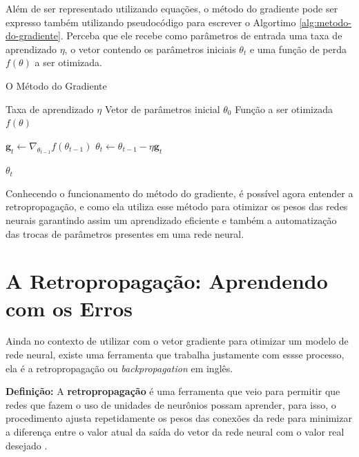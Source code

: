 Além de ser representado utilizando equações, o método do gradiente pode ser expresso também utilizando pseudocódigo para escrever o Algortimo \ref{alg:metodo-do-gradiente}. Perceba que ele recebe como parâmetros de entrada uma taxa de aprendizado $\eta$, o vetor contendo os parâmetros iniciais $\theta_t$ e uma função de perda $f(\theta)$ a ser otimizada.

\begin{algorithm}[H] %
    \caption{O Método do Gradiente}
    \label{alg:metodo-do-gradiente}
    \begin{algorithmic}[1] %

    \Require Taxa de aprendizado $\eta$
    \Require Vetor de parâmetros inicial $\theta_0$
    \Require Função a ser otimizada $f(\theta)$

        \State $\textbf{g}_t \leftarrow \nabla_{\theta_{t-1}} f(\theta_{t-1})$
        \State $\theta_t \leftarrow \theta_{t-1} - \eta \textbf{g}_t$
    \EndWhile

    \State \Return $\theta_t$ 
    \end{algorithmic}
\end{algorithm}

Conhecendo o funcionamento do método do gradiente, é possível agora entender a retropropagação, e como ela utiliza esse método para otimizar os pesos das redes neurais garantindo assim um aprendizado eficiente e também a automatização das trocas de parâmetros presentes em uma rede neural.


\section{A Retropropagação: Aprendendo com os Erros}

Ainda no contexto de utilizar com o vetor gradiente para otimizar um modelo de rede neural, existe uma ferramenta que trabalha justamente com essse processo, ela é a retropropagação ou \textit{backpropagation} em inglês.

\begin{definicaomoderna}{\textbf{Definição:}}
A \textbf{retropropagação} é uma ferramenta que veio para permitir que redes que fazem o uso de unidades de neurônios possam aprender, para isso, o procedimento ajusta repetidamente os pesos das conexões da rede para minimizar a diferença entre o valor atual da saída do vetor da rede neural com o valor real desejado \parencite{BackpropagationArticle}.
\end{definicaomoderna}

